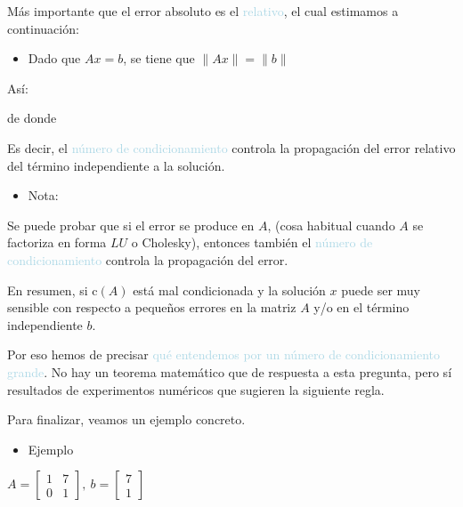 \documentclass[12pt]{article}
\begin{document}
Más importante que el error absoluto es el \textcolor{lightblue}{relativo}, el cual estimamos a continuación:
\begin{itemize}
\item Dado que $Ax=b$, se tiene que $\|Ax\|=\|b\|$
\end{itemize}
Así:
\begin{center}
\end{center}de donde \begin{center}
\end{center}

Es decir, el \textcolor{lightblue}{número de condicionamiento} controla la propagación del error relativo del término independiente a la solución.

\begin{itemize}[label=\color{red}\textbullet, leftmargin=*]
    \item \color{lightblue}Nota:
\end{itemize}
Se puede probar que si el error se produce en $A$, (cosa habitual cuando $A$ se factoriza en forma $LU$ o Cholesky), entonces también el \textcolor{lightblue}{número de condicionamiento} controla la propagación del error.

En resumen, si $\mathrm{c}(A)$ está mal condicionada y la solución $x$ puede ser muy sensible con respecto a pequeños errores en la matriz $A$ y/o en el término independiente $b$.

Por eso hemos de precisar \textcolor{lightblue}{qué entendemos por un número de condicionamiento grande}. No hay un teorema matemático que de respuesta a esta pregunta, pero sí resultados de experimentos numéricos que sugieren la siguiente regla.
\begin{center}
\end{center}
Para finalizar, veamos un ejemplo concreto.
\begin{itemize}[label=\color{red}\textbullet, leftmargin=*]
    \item \color{lightblue} Ejemplo
\end{itemize}
$A=\begin{bmatrix}
1 & 7 \\ 
0 & 1
\end{bmatrix},~b=\begin{bmatrix}
7 \\ 
1
\end{bmatrix}$
\end{document}
